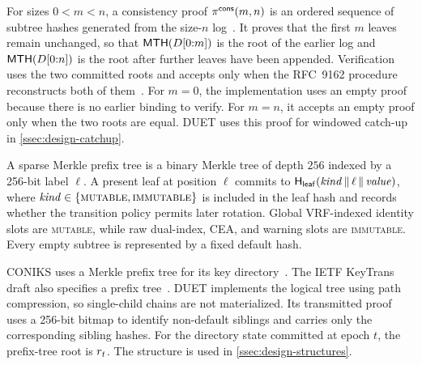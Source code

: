 \begin{definition}\label{def:consistency}
For sizes $0<m<n$, a consistency proof $\pi^{\mathsf{cons}}(m,n)$ is an ordered sequence of subtree hashes
generated from the size-$n$ log~\cite[Section~2.1.4.1]{rfc9162}. It proves that the first $m$
leaves remain unchanged, so that $\mathsf{MTH}(D[0{:}m])$ is the root of the earlier log and
$\mathsf{MTH}(D[0{:}n])$ is the root after further leaves have been appended. Verification uses the two
committed roots and accepts only when the RFC~9162 procedure reconstructs both of
them~\cite[Section~2.1.4.2]{rfc9162}. For $m=0$, the implementation uses an empty proof because
there is no earlier binding to verify. For $m=n$, it accepts an empty proof only when the two roots
are equal. DUET uses this proof for windowed catch-up in \cref{ssec:design-catchup}.
\end{definition}

\begin{definition}\label{def:prefix-tree}
A sparse Merkle prefix tree is a binary Merkle tree of depth $256$ indexed by a 256-bit label
$\ell$. A present leaf at position $\ell$ commits to
$\mathsf{H}_{\mathsf{leaf}}(\mathit{kind}\,\|\,\ell\,\|\,\mathit{value})$, where
$\mathit{kind}\in\{\textsc{mutable},\textsc{immutable}\}$ is included in the leaf hash and records
whether the transition policy permits later rotation. Global VRF-indexed identity slots are
\textsc{mutable}, while raw dual-index, CEA, and warning slots are \textsc{immutable}. Every empty
subtree is represented by a fixed default hash.

CONIKS uses a Merkle prefix tree for its key
directory~\cite[Section~3.1]{melara2015coniks}. The IETF KeyTrans draft also specifies a prefix
tree~\cite[Section~3.3]{ietf-keytrans-protocol}. DUET implements the logical tree using path
compression, so single-child chains are not materialized. Its transmitted proof uses a 256-bit
bitmap to identify non-default siblings and carries only the corresponding sibling hashes. For the
directory state committed at epoch $t$, the prefix-tree root is $r_{t}$. The structure is
used in \cref{ssec:design-structures}.
\end{definition}

